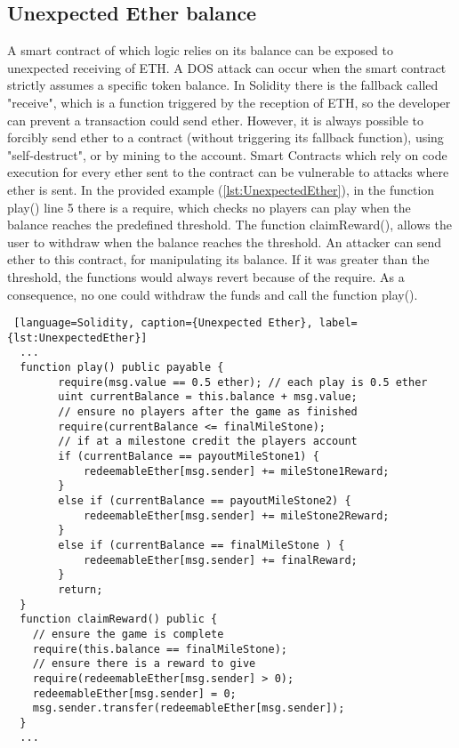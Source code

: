\documentclass[a4paper,sigconf, language=french,
language=german, language=spanish, language=english]{acmart}
\begin{document}
\subsection{Unexpected Ether balance} 
A smart contract of which logic relies on its balance can be exposed to unexpected receiving of ETH. 
A DOS attack can occur when the smart contract strictly assumes a specific token balance. 
In Solidity there is the fallback called "receive", which is a function triggered by the reception of ETH, so the developer can prevent a transaction could send ether. However, it is always possible to forcibly send ether to a contract (without triggering its fallback function), using "self-destruct", or by mining to the account. Smart Contracts which rely on code execution for every ether sent to the contract can be vulnerable to attacks where ether is sent.
In the provided example (\autoref{lst:UnexpectedEther}), in the function play() line 5 there is a require, which checks no players can play when the balance 
reaches the predefined threshold. The function claimReward(), allows the user to withdraw when the balance reaches the threshold. 
An attacker can send ether to this contract, for manipulating its balance. If it was greater than the threshold, the functions would always 
revert because of the require. As a consequence, no one could withdraw the funds and call the function play().

\begin{lstlisting} [language=Solidity, caption={Unexpected Ether}, label={lst:UnexpectedEther}]
  ...
  function play() public payable {
        require(msg.value == 0.5 ether); // each play is 0.5 ether
        uint currentBalance = this.balance + msg.value;
        // ensure no players after the game as finished
        require(currentBalance <= finalMileStone);
        // if at a milestone credit the players account
        if (currentBalance == payoutMileStone1) {
            redeemableEther[msg.sender] += mileStone1Reward;
        }
        else if (currentBalance == payoutMileStone2) {
            redeemableEther[msg.sender] += mileStone2Reward;
        }
        else if (currentBalance == finalMileStone ) {
            redeemableEther[msg.sender] += finalReward;
        }
        return;
  }
  function claimReward() public {
    // ensure the game is complete
    require(this.balance == finalMileStone);
    // ensure there is a reward to give
    require(redeemableEther[msg.sender] > 0); 
    redeemableEther[msg.sender] = 0;
    msg.sender.transfer(redeemableEther[msg.sender]);
  }
  ...
\end{lstlisting}
\end{document}

